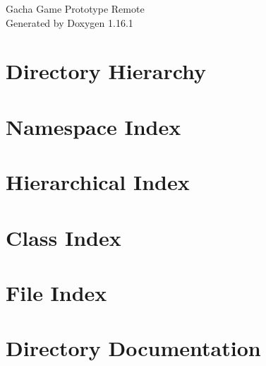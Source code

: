 \documentclass[twoside]{book}
\newcommand{\+}{\discretionary{\mbox{\scriptsize$\hookleftarrow$}}{}{}}
\newcommand{\clearemptydoublepage}{%
    \newpage{\pagestyle{empty}\cleardoublepage}%
  }
\begin{document}
  \raggedbottom
    \hypersetup{pageanchor=false,
                bookmarksnumbered=true,
                pdfencoding=unicode
               }
  \begin{titlepage}
  \vspace*{7cm}
  \begin{center}%
  {\Large Gacha Game Prototype Remote}\\
  \vspace*{1cm}
  {\large Generated by Doxygen 1.16.1}\\
  \end{center}
  \end{titlepage}
  \clearemptydoublepage
  \tableofcontents
  \clearemptydoublepage
  \hypersetup{pageanchor=true}
\chapter{Directory Hierarchy}

\chapter{Namespace Index}

\chapter{Hierarchical Index}

\chapter{Class Index}

\chapter{File Index}

\chapter{Directory Documentation}













\end{document}
